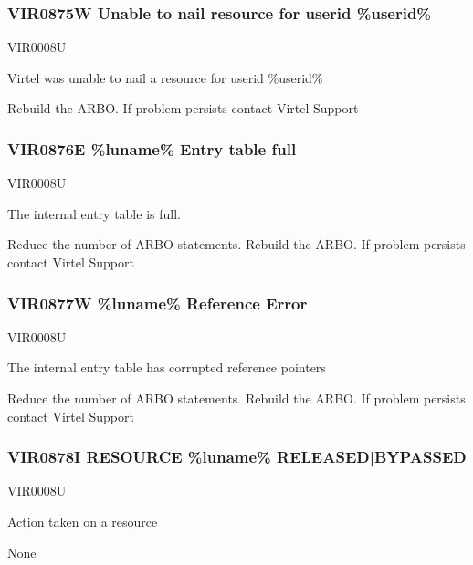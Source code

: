 \documentclass[letterpaper,10pt,english]{sphinxmanual}
\begin{document}
\subsubsection{VIR0875W Unable to nail resource for userid \%userid\%}
\label{\detokenize{messages:vir0875w-unable-to-nail-resource-for-userid-userid}}\begin{description}
\sphinxAtStartPar
VIR0008U

\sphinxAtStartPar
Virtel was unable to nail a resource for userid \%userid\%

\sphinxAtStartPar
Rebuild the ARBO. If problem persists contact Virtel Support

\end{description}


\subsubsection{VIR0876E \%luname\% Entry table full}
\label{\detokenize{messages:vir0876e-luname-entry-table-full}}\begin{description}
\sphinxAtStartPar
VIR0008U

\sphinxAtStartPar
The internal entry table is full.

\sphinxAtStartPar
Reduce the number of ARBO statements. Rebuild the ARBO. If problem persists contact Virtel Support

\end{description}


\subsubsection{VIR0877W \%luname\% Reference Error}
\label{\detokenize{messages:vir0877w-luname-reference-error}}\begin{description}
\sphinxAtStartPar
VIR0008U

\sphinxAtStartPar
The internal entry table has corrupted reference pointers

\sphinxAtStartPar
Reduce the number of ARBO statements. Rebuild the ARBO. If problem persists contact Virtel Support

\end{description}


\subsubsection{VIR0878I RESOURCE \%luname\% RELEASED|BYPASSED}
\label{\detokenize{messages:vir0878i-resource-luname-released-bypassed}}\begin{description}
\sphinxAtStartPar
VIR0008U

\sphinxAtStartPar
Action taken on a resource

\sphinxAtStartPar
None

\end{description}
\end{document}
